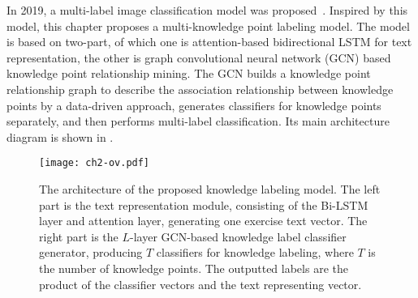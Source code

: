 
In 2019, a multi-label image classification model was proposed~\cite{chen2019multi}. Inspired by this model, this chapter proposes a multi-knowledge point labeling model. The model is based on two-part, of which one is attention-based bidirectional LSTM for text representation, the other is graph convolutional neural network (GCN) based knowledge point relationship mining. The GCN builds a knowledge point relationship graph to describe the association relationship between knowledge points by a data-driven approach, generates classifiers for knowledge points separately, and then performs multi-label classification. Its main architecture diagram is shown in \figname{\ref{fig:ch2-modelarchitecture}}.

\begin{figure}[htbp!]
    \centering
    \texttt{[image: ch2-ov.pdf]}
    \caption{The architecture of the proposed knowledge labeling model. The left part is the text representation module, consisting of the Bi-LSTM layer and attention layer, generating one exercise text vector. The right part is the \(L\)-layer GCN-based knowledge label classifier generator, producing \(T\) classifiers for knowledge labeling, where \(T\) is the number of knowledge points. The outputted labels are the product of the classifier vectors and the text representing vector.}\label{fig:ch2-modelarchitecture}
\end{figure}




